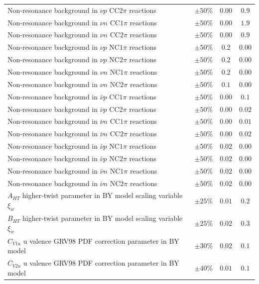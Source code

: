 \begin{longtable}{p{3.25in} c c c}
  Non-resonance background in $\nu p$ CC$2\pi$ reactions & $\pm50\%$ & $0.00$ & $0.9$ \\
  Non-resonance background in $\nu n$ CC$1\pi$ reactions & $\pm50\%$ & $0.00$ & $1.9$ \\
  Non-resonance background in $\nu n$ CC$2\pi$ reactions & $\pm50\%$ & $0.00$ & $0.9$ \\
  Non-resonance background in $\nu p$ NC$1\pi$ reactions & $\pm50\%$ & $0.2$ & $0.00$ \\
  Non-resonance background in $\nu p$ NC$2\pi$ reactions & $\pm50\%$ & $0.2$ & $0.00$ \\
  Non-resonance background in $\nu n$ NC$1\pi$ reactions & $\pm50\%$ & $0.2$ & $0.00$ \\
  Non-resonance background in $\nu n$ NC$2\pi$ reactions & $\pm50\%$ & $0.1$ & $0.00$ \\
  Non-resonance background in $\bar{\nu} p$ CC$1\pi$ reactions & $\pm50\%$ & $0.00$ & $0.1$ \\
  Non-resonance background in $\bar{\nu} p$ CC$2\pi$ reactions & $\pm50\%$ & $0.00$ & $0.02$ \\
  Non-resonance background in $\bar{\nu} n$ CC$1\pi$ reactions & $\pm50\%$ & $0.00$ & $0.01$ \\
  Non-resonance background in $\bar{\nu} n$ CC$2\pi$ reactions & $\pm50\%$ & $0.00$ & $0.02$ \\
  Non-resonance background in $\bar{\nu} p$ NC$1\pi$ reactions & $\pm50\%$ & $0.02$ & $0.00$ \\
  Non-resonance background in $\bar{\nu} p$ NC$2\pi$ reactions & $\pm50\%$ & $0.02$ & $0.00$ \\
  Non-resonance background in $\bar{\nu} n$ NC$1\pi$ reactions & $\pm50\%$ & $0.02$ & $0.00$ \\
  Non-resonance background in $\bar{\nu} n$ NC$2\pi$ reactions & $\pm50\%$ & $0.02$ & $0.00$ \\
  $A_{HT}$ higher-twist parameter in BY model scaling \newline variable $\xi_w$ & $\pm25\%$ & $0.01$ & $0.2$ \\
  $B_{HT}$ higher-twist parameter in BY model scaling \newline variable $\xi_w$ & $\pm25\%$ & $0.02$ & $0.3$ \\
  $C_{V1u}$ u valence GRV98 PDF correction parameter \newline in BY model & $\pm30\%$ & $0.02$ & $0.1$ \\
  $C_{V2u}$ u valence GRV98 PDF correction parameter \newline in BY model & $\pm40\%$ & $0.01$ & $0.1$ \\

\end{longtable}
